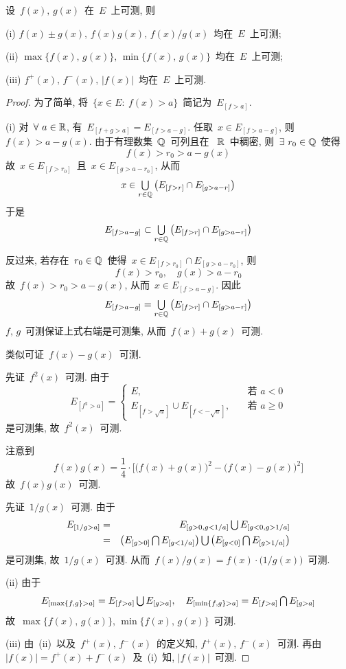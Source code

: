 \begin{proposition}
设~$f(x),\,g(x)$~在~$E$~上可测, 则

(i) $f(x) \pm g(x), \, f(x)g(x), \, f(x)/g(x)$~均在~$E$~上可测;

(ii) $\max\{f(x),\,g(x)\}, \, \min\{f(x),\,g(x)\}$~均在~$E$~上可测;

(iii) $f^+(x), \, f^-(x), \, |f(x)|$~均在~$E$~上可测.
\end{proposition}

\begin{proof}
为了简单, 将~$\{x \in E: \: f(x) > a\}$~简记为~$E_{[f>a]}$.

(i) 对~$\forall~a \in \mathbb{R}$, 有~$E_{[f+g>a]} = E_{[f>a-g]}$. 任取~$x \in E_{[f>a-g]}$, 则~$f(x) > a - g(x)$. 由于有理数集~$\mathbb{Q}$~可列且在
~$\mathbb{R}$~中稠密, 则~$\exists~r_0 \in \mathbb{Q}$~使得
\[
f(x) > r_0 > a - g(x)
\]
故~$x \in E_{[f>r_0]}$~且~$x \in E_{[g>a-r_0]}$, 从而
\[
x \in \mathop{\textstyle{\bigcup}}\limits_{r \in \mathbb{Q}} \big( E_{[f>r]} \cap E_{[g>a-r]}\big)
\]
于是
\[
E_{[f>a-g]} \subset \mathop{\textstyle{\bigcup}}\limits_{r \in \mathbb{Q}} \big( E_{[f>r]} \cap E_{[g>a-r]}\big)
\]

反过来, 若存在~$r_0 \in \mathbb{Q}$~使得~$x \in  E_{[f>r_0]} \cap E_{[g>a-r_0]}$, 则
\[
f(x) > r_0, \quad g(x) > a - r_0
\]
故~$f(x) > r_0 > a - g(x)$, 从而~$x \in E_{[f>a-g]}$. 因此
\[
E_{[f>a-g]} =\mathop{\textstyle{\bigcup}}\limits_{r \in \mathbb{Q}} \big( E_{[f>r]} \cap E_{[g>a-r]}\big)
\]
$f,\,g$~可测保证上式右端是可测集, 从而~$f(x)+g(x)$~可测.

类似可证~$f(x)-g(x)$~可测.

先证~$f^2(x)$~可测. 由于
\[
E_{[f^2>a]} = \left\{
\begin{array}{cl}
E, & \quad \mbox{若~} a < 0 \\[0.1cm]
E_{[f>\sqrt{a}]} \cup E_{[f<-\sqrt{a}]}, & \quad \mbox{若~} a \geqslant 0
\end{array}
\right.
\]
是可测集, 故~$f^2(x)$~可测.

注意到
\[
f(x)g(x) = \frac{1}{4} \cdot \big[ \big( f(x) + g(x) \big)^2 - \big( f(x) - g(x) \big)^2 \big]
\]
故~$f(x)g(x)$~可测.

先证~$1/g(x)$~可测. 由于
\begin{eqnarray*}
E_{[1/g>a]} &=& E_{[g>0,g<1/a]} \mathop{\textstyle{\bigcup}} E_{[g<0,g>1/a]} \\
&=& \big(E_{[g>0]} \mathop{\textstyle{\bigcap}} E_{[g<1/a]} \big) \mathop{\textstyle{\bigcup}} \big(E_{[g<0]} \mathop{\textstyle{\bigcap}} E_{[g>1/a]} \big)
\end{eqnarray*}
是可测集, 故~$1/g(x)$~可测. 从而~$f(x)/g(x) = f(x)\cdot\big(1/g(x)\big)$~可测.

(ii) 由于
\[
E_{[\max\{f,g\}>a]} = E_{[f>a]} \mathop{\textstyle{\bigcup}} E_{[g>a]}, \quad E_{[\min\{f,g\}>a]} = E_{[f>a]} \mathop{\textstyle{\bigcap}} E_{[g>a]}
\]
故~$\max\{f(x),\,g(x)\}, \, \min\{f(x),\,g(x)\}$~可测.

(iii) 由~(ii)~以及~$f^+(x), \, f^-(x)$~的定义知, $f^+(x),\,f^-(x)$~可测. 再由~$|f(x)| = f^+(x) + f^-(x)$~及~(i)~知, $|f(x)|$~可测.
\end{proof}


